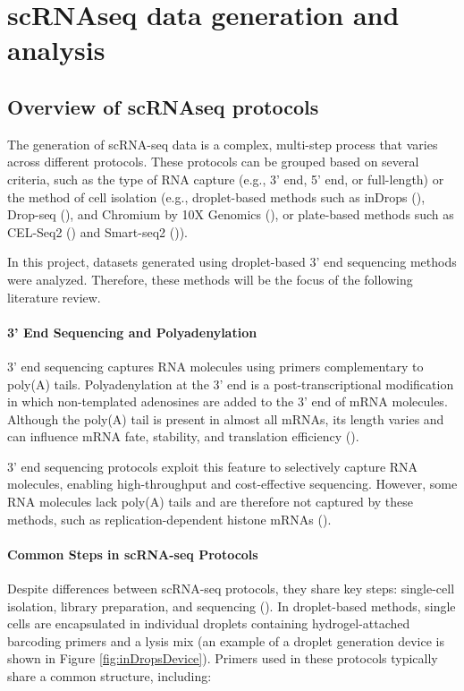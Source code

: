 \section{scRNAseq data generation and analysis}

\subsection{Overview of scRNAseq protocols}

The generation of scRNA-seq data is a complex, multi-step process that varies across different protocols.
These protocols can be grouped based on several criteria, such as the type of RNA capture
(e.g., 3' end, 5' end, or full-length) or the method of cell isolation
(e.g., droplet-based methods such as inDrops (\cite{Klein2015}), Drop-seq (\cite{Macosko2015}),
and Chromium by 10X Genomics (\cite{Zheng2017}),
or plate-based methods such as CEL-Seq2 (\cite{Hashimshony2016}) and Smart-seq2 (\cite{Picelli2013})).

In this project, datasets generated using droplet-based 3' end sequencing methods were analyzed.
Therefore, these methods will be the focus of the following literature review.

\paragraph{3' End Sequencing and Polyadenylation}

3' end sequencing captures RNA molecules using primers complementary to poly(A) tails.
Polyadenylation at the 3' end is a post-transcriptional modification
in which non-templated adenosines are added to the 3' end of mRNA molecules.
Although the poly(A) tail is present in almost all mRNAs,
its length varies and can influence mRNA fate, stability, and translation efficiency (\cite{Brouze2022}).

3' end sequencing protocols exploit this feature to selectively capture RNA molecules,
enabling high-throughput and cost-effective sequencing.
However, some RNA molecules lack poly(A) tails and are therefore not captured by these methods,
such as replication-dependent histone mRNAs (\cite{Brouze2022}).

\paragraph{Common Steps in scRNA-seq Protocols}

Despite differences between scRNA-seq protocols, they share key steps:
single-cell isolation, library preparation, and sequencing (\cite{Andrews2018}).
In droplet-based methods, single cells are encapsulated in individual droplets containing hydrogel-attached barcoding primers
and a lysis mix (an example of a droplet generation device is shown in Figure \ref{fig:inDropsDevice}).
Primers used in these protocols typically share a common structure, including:

